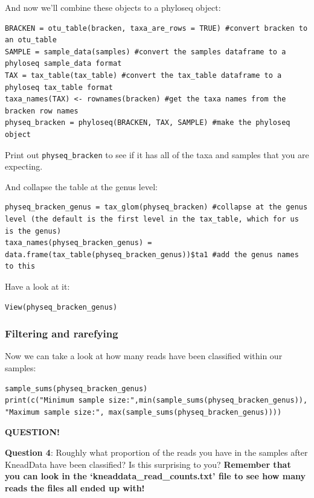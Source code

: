 \documentclass[
]{book}
\newenvironment{bluebox}{
  \definecolor{shadecolor}{RGB}{172, 210, 237}
  \color{white}
  \begin{shaded}}
 {\end{shaded}}
\begin{document}
And now we'll combine these objects to a phyloseq object:

\begin{verbatim}
BRACKEN = otu_table(bracken, taxa_are_rows = TRUE) #convert bracken to an otu_table
SAMPLE = sample_data(samples) #convert the samples dataframe to a phyloseq sample_data format
TAX = tax_table(tax_table) #convert the tax_table dataframe to a phyloseq tax_table format
taxa_names(TAX) <- rownames(bracken) #get the taxa names from the bracken row names
physeq_bracken = phyloseq(BRACKEN, TAX, SAMPLE) #make the phyloseq object
\end{verbatim}

Print out \texttt{physeq\_bracken} to see if it has all of the taxa and samples that you are expecting.

And collapse the table at the genus level:

\begin{verbatim}
physeq_bracken_genus = tax_glom(physeq_bracken) #collapse at the genus level (the default is the first level in the tax_table, which for us is the genus)
taxa_names(physeq_bracken_genus) = data.frame(tax_table(physeq_bracken_genus))$ta1 #add the genus names to this
\end{verbatim}

Have a look at it:

\begin{verbatim}
View(physeq_bracken_genus)
\end{verbatim}

\subsubsection{Filtering and rarefying}\label{filtering-and-rarefying}

Now we can take a look at how many reads have been classified within our samples:

\begin{verbatim}
sample_sums(physeq_bracken_genus)
print(c("Minimum sample size:",min(sample_sums(physeq_bracken_genus)), "Maximum sample size:", max(sample_sums(physeq_bracken_genus))))
\end{verbatim}

\begin{bluebox}

\begin{center}
\textbf{QUESTION!}

\end{center}

\textbf{Question 4}: Roughly what proportion of the reads you have in the samples after KneadData have been classified? Is this surprising to you?
\textbf{Remember that you can look in the `kneaddata\_read\_counts.txt' file to see how many reads the files all ended up with!}

\end{bluebox}
\end{document}
